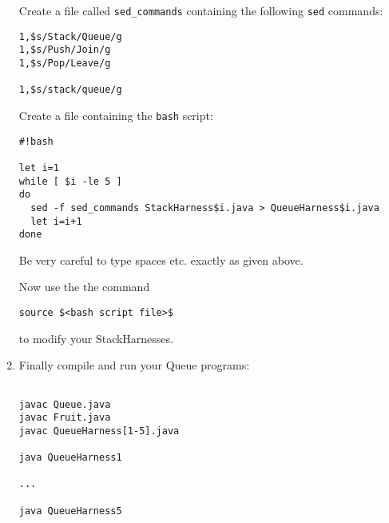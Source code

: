 \begin{enumerate}
Create a file called {\tt sed\_commands} containing the following {\tt sed} commands:
\begin{verbatim}
1,$s/Stack/Queue/g
1,$s/Push/Join/g
1,$s/Pop/Leave/g

1,$s/stack/queue/g

\end{verbatim}

Create a file containing the {\tt bash} script:
\begin{verbatim}
#!bash

let i=1
while [ $i -le 5 ]
do
  sed -f sed_commands StackHarness$i.java > QueueHarness$i.java
  let i=i+1
done
\end{verbatim}

Be very careful to type spaces etc. exactly as given above.

Now use the the command 
\begin{verbatim} 
source $<bash script file>$ 
\end{verbatim}

to modify your StackHarnesses.

\item Finally compile and run your Queue programs:
\begin{verbatim}

javac Queue.java
javac Fruit.java
javac QueueHarness[1-5].java

java QueueHarness1

...

java QueueHarness5
\end{verbatim}

\end{enumerate}



